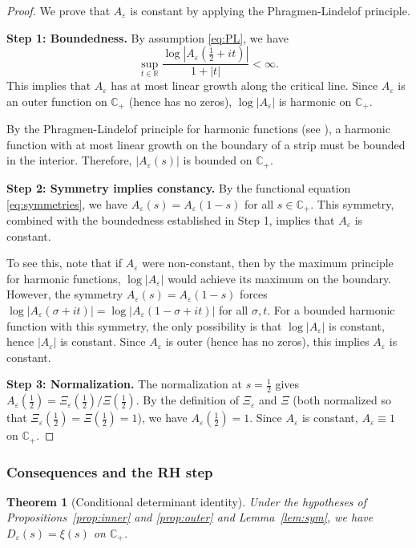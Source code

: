 ﻿\documentclass[12pt,a4paper]{article}
\newtheorem{theorem}{Theorem}[section]
\theoremstyle{definition}
\theoremstyle{remark}
\newcommand{\CC}{\mathbb{C}}
\newcommand{\RR}{\mathbb{R}}
\begin{document}
\begin{proof}
We prove that $A_\varepsilon$ is constant by applying the Phragmen-Lindelof principle.

\textbf{Step 1: Boundedness.}
By assumption \eqref{eq:PL}, we have
\[
  \sup_{t\in\RR}\frac{\log|A_\varepsilon(\tfrac12+it)|}{1+|t|} < \infty.
\]
This implies that $A_\varepsilon$ has at most linear growth along the critical line. Since $A_\varepsilon$ is an outer function on $\CC_+$ (hence has no zeros), $\log|A_\varepsilon|$ is harmonic on $\CC_+$.

By the Phragmen-Lindelof principle for harmonic functions (see \cite[Thm.~5.65]{RudinRCA}), a harmonic function with at most linear growth on the boundary of a strip must be bounded in the interior. Therefore, $|A_\varepsilon(s)|$ is bounded on $\CC_+$.

\textbf{Step 2: Symmetry implies constancy.}
By the functional equation \eqref{eq:symmetries}, we have $A_\varepsilon(s) = A_\varepsilon(1-s)$ for all $s \in \CC_+$. This symmetry, combined with the boundedness established in Step 1, implies that $A_\varepsilon$ is constant.

To see this, note that if $A_\varepsilon$ were non-constant, then by the maximum principle for harmonic functions, $\log|A_\varepsilon|$ would achieve its maximum on the boundary. However, the symmetry $A_\varepsilon(s) = A_\varepsilon(1-s)$ forces $\log|A_\varepsilon(\sigma+it)| = \log|A_\varepsilon(1-\sigma+it)|$ for all $\sigma, t$. For a bounded harmonic function with this symmetry, the only possibility is that $\log|A_\varepsilon|$ is constant, hence $|A_\varepsilon|$ is constant. Since $A_\varepsilon$ is outer (hence has no zeros), this implies $A_\varepsilon$ is constant.

\textbf{Step 3: Normalization.}
The normalization at $s=\tfrac12$ gives $A_\varepsilon(\tfrac12) = \Xi_\varepsilon(\tfrac12)/\Xi(\tfrac12)$. By the definition of $\Xi_\varepsilon$ and $\Xi$ (both normalized so that $\Xi_\varepsilon(\tfrac12) = \Xi(\tfrac12) = 1$), we have $A_\varepsilon(\tfrac12) = 1$. Since $A_\varepsilon$ is constant, $A_\varepsilon \equiv 1$ on $\CC_+$.
\end{proof}

\subsubsection*{Consequences and the RH step}
\begin{theorem}[Conditional determinant identity]\label{thm:conditional}
Under the hypotheses of Propositions~\ref{prop:inner} and \ref{prop:outer} and Lemma~\ref{lem:sym}, we have $D_\varepsilon(s)=\xi(s)$ on $\CC_+$.
\end{theorem}
\end{document}
